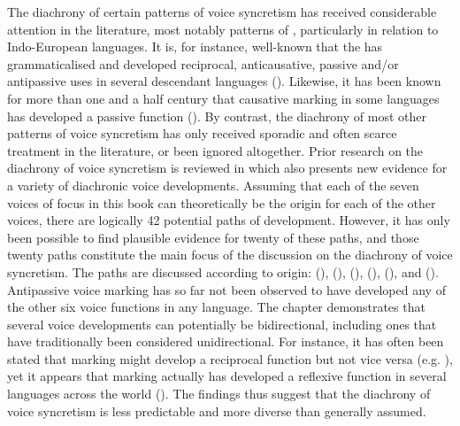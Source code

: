 The diachrony of certain patterns of voice syncretism has received considerable attention in the literature, most notably patterns of , particularly in relation to Indo-European languages. It is, for instance, well-known that the    has grammaticalised and developed reciprocal, anticausative, passive and/or antipassive uses in several descendant languages (). Likewise, it has been known for more than one and a half century that causative marking in some languages has developed a passive function (). By contrast, the diachrony of most other patterns of voice syncretism has only received sporadic and often scarce treatment in the literature, or been ignored altogether. Prior research on the diachrony of voice syncretism is reviewed in  which also presents new evidence for a variety of diachronic voice developments. Assuming that each of the seven voices of focus in this book can theoretically be the origin for each of the other voices, there are logically 42 potential paths of development. However, it has only been possible to find plausible evidence for twenty of these paths, and those twenty paths constitute the main focus of the discussion on the diachrony of voice syncretism. The paths are discussed according to origin:  (),  (),  (),  (),  (), and  (). Antipassive voice marking has so far not been observed to have developed any of the other six voice functions in any language. The chapter demonstrates that several voice developments can potentially be bidirectional, including ones that have traditionally been considered unidirectional. For instance, it has often been stated that  marking might develop a reciprocal function but not vice versa (e.g. \citealt{heine:2000, heine:miyashita:2008}), yet it appears that  marking actually has developed a reflexive function in several languages across the world (). The findings thus suggest that the diachrony of voice syncretism is less predictable and more diverse than generally assumed.

